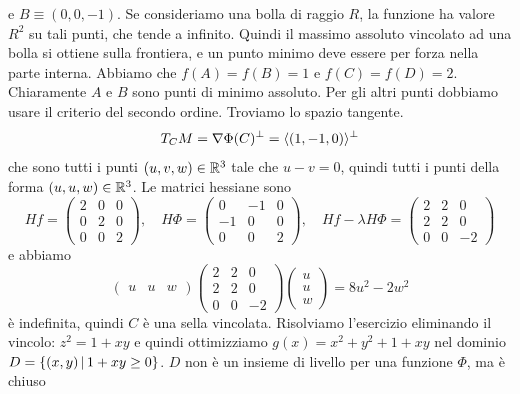 \documentclass[a4paper]{article}
\begin{document}
\begin{snippetexercise}{}
    e \(B \equiv (0,0,-1)\).
    Se consideriamo una bolla di raggio \(R\), la funzione ha valore \(R^2\)
    su tali punti, che tende a infinito. Quindi il massimo assoluto vincolato ad una bolla
    si ottiene sulla frontiera, e un punto minimo deve essere per forza nella parte interna.
    Abbiamo che \(f(A) = f(B) = 1\) e \(f(C) = f(D) = 2\).
    Chiaramente \(A\) e \(B\) sono punti di minimo assoluto.
    Per gli altri punti dobbiamo usare il criterio del secondo ordine.
    Troviamo lo spazio tangente.
    \[
        T_CM = \nabla \Phi(C)^\perp = \langle (1, -1, 0) \rangle^\perp
    \]
    che sono tutti i punti \((u, v, w) \in \mathbb{R}^3\) tale che \(u - v = 0\),
    quindi tutti i punti della forma \((u, u, w) \in \mathbb{R}^3\).
    Le matrici hessiane sono
    \[
        Hf = \begin{pmatrix}
            2 & 0 & 0 \\ 0 & 2 & 0 \\ 0 & 0 & 2
        \end{pmatrix}, \quad
        H\Phi = \begin{pmatrix}
            0 & -1 & 0 \\
            -1 & 0 & 0 \\
            0 & 0 & 2
        \end{pmatrix}, \quad
        Hf - \lambda H\Phi = \begin{pmatrix}
            2&2&0\\2&2&0\\0&0&-2
        \end{pmatrix}
    \]
    e abbiamo
    \[
        \begin{pmatrix}
            u & u & w 
        \end{pmatrix}
        \begin{pmatrix}
            2&2&0\\2&2&0\\0&0&-2
        \end{pmatrix}
        \begin{pmatrix}
            u \\ u \\ w 
        \end{pmatrix}
        = 8u^2 - 2w^2
    \]
    è indefinita, quindi \(C\) è una sella vincolata.
    Risolviamo l'esercizio eliminando il vincolo: \(z^2 = 1 + xy\)
    e quindi ottimizziamo \(g(x) = x^2 + y^2 + 1 + xy\)
    nel dominio \(D = \{(x,y) \,|\, 1 + xy \geq 0\}\).
    \(D\) non è un insieme di livello per una funzione \(\Phi\), ma è chiuso

\end{snippetexercise}
\end{document}

